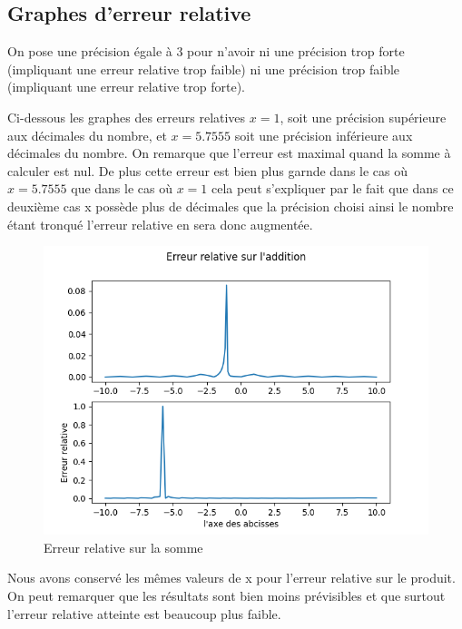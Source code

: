 \documentclass{article}
\begin{document}
\subsection*{Graphes d'erreur relative}

On pose une précision égale à 3 pour n'avoir ni une précision trop forte (impliquant une erreur relative trop faible) ni une précision trop faible (impliquant une erreur relative trop forte).

Ci-dessous les graphes des erreurs relatives ${x = 1}$, soit une précision supérieure aux décimales du nombre, et ${x = 5.7555}$ soit une précision inférieure aux décimales du nombre. On remarque que l'erreur est maximal quand la somme à calculer est nul. De plus cette erreur est bien plus garnde dans le cas où ${x=5.7555}$ que dans le cas où ${x=1}$ cela peut s'expliquer par le fait que dans ce deuxième cas x possède plus de décimales que la précision choisi ainsi le nombre étant tronqué l'erreur relative en sera donc augmentée. 


\begin{figure}[ht]
    \centering
    \includegraphics[scale=0.6]{erreur_add.png}
    \caption{Erreur relative sur la somme}
    \label{fig:erreur_add}
\end{figure}

Nous avons conservé les mêmes valeurs de x pour l'erreur relative sur le produit. On peut remarquer que les résultats sont bien moins prévisibles et que surtout l'erreur relative atteinte est beaucoup plus faible. 
\end{document}
